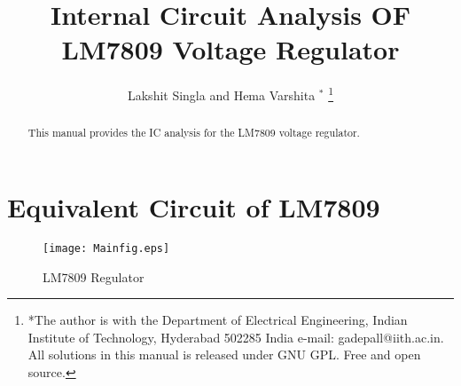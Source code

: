 \documentclass[journal,12pt,twocolumn]{IEEEtran}
\renewcommand\thesection{\arabic{section}}
\begin{document}
\makeatletter
{}
\makeatother
\let\StandardTheFigure\thefigure
\renewcommand{\thefigure}{\thesection}
\makeatletter
{}
\makeatother
\let\StandardTheFigure\thefigure
\let\StandardTheTable\thetable
\let\vec\mathbf
\def\putbox#1#2#3{\makebox[0in][l]{\makebox[#1][l]{}\raisebox{\baselineskip}[0in][0in]{\raisebox{#2}[0in][0in]{#3}}}}
     \def\rightbox#1{\makebox[0in][r]{#1}}
     \def\centbox#1{\makebox[0in]{#1}}
     \def\topbox#1{\raisebox{-\baselineskip}[0in][0in]{#1}}
     \def\midbox#1{\raisebox{-0.5\baselineskip}[0in][0in]{#1}}
\vspace{3cm}
\title{ 
Internal Circuit Analysis OF LM7809 Voltage Regulator
}
\author{ Lakshit Singla and Hema Varshita $^{*}$%
	\thanks{*The author is with the Department
		of Electrical Engineering, Indian Institute of Technology, Hyderabad
		502285 India e-mail:  gadepall@iith.ac.in. All solutions in this manual is released under GNU 
GPL.  Free and open source.}
	
}
\maketitle
\tableofcontents
\bigskip
\renewcommand{\thefigure}{\theenumi}
\renewcommand{\thetable}{\theenumi}
\begin{abstract}
This manual provides the IC analysis for the LM7809 voltage regulator. 
\end{abstract}
\section{Equivalent Circuit of LM7809}
\begin{enumerate}[label=\thesection.\arabic*,ref=\thesection.\theenumi]
\begin{figure}[!ht]
\centering	
\texttt{[image: Mainfig.eps]}
\caption{LM7809 Regulator}
\label{fig:orig}	
\end{figure}
\end{enumerate}
\end{document}
